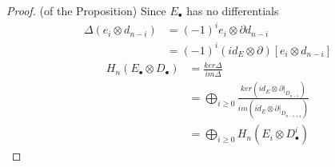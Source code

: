\documentclass[11pt]{article}
\newcommand{\pd}{\partial}
\begin{document}
\begin{proof}(of the Proposition)
Since $E_\bullet$ has no differentials
$$
\begin{aligned}
\Delta(e_i\otimes d_{n-i})&=(-1)^{i} e_i \otimes \pd d_{n-i}\\
&=(-1)^i (id_E\otimes \pd)[e_i\otimes d_{n-i}]
\end{aligned}
$$
$$
\begin{aligned}
H_n(E_\bullet\otimes D_\bullet)&=\frac{ker\Delta}{im \Delta}\\
&=\bigoplus_{i\geq 0}\frac{ker(id_E\otimes \pd|_{D_{n-i}})}{im(id_E\otimes \pd|_{D_{n-i+1}})}\\
&=\bigoplus_{i\geq 0} H_n(E_i\otimes D^i_\bullet)
\end{aligned}
$$
\end{proof}
\end{document}
